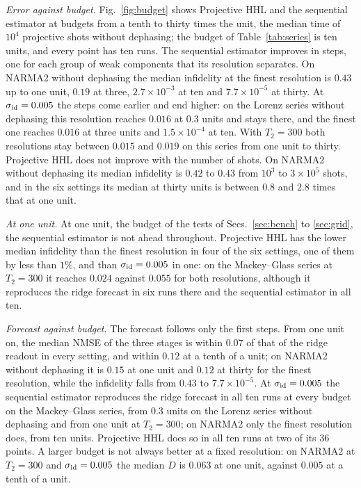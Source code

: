 \documentclass[journal]{IEEEtran}
\begin{document}
\emph{Error against budget.} Fig.~\ref{fig:budget} shows Projective HHL and the sequential estimator at budgets from a tenth to thirty times the unit, the median time of $10^4$ projective shots without dephasing; the budget of Table~\ref{tab:series} is ten units, and every point has ten runs. The sequential estimator improves in steps, one for each group of weak components that its resolution separates. On NARMA2 without dephasing the median infidelity at the finest resolution is $0.43$ up to one unit, $0.19$ at three, $2.7\times10^{-3}$ at ten and $7.7\times10^{-5}$ at thirty. At $\sigma_{\rm id}=0.005$ the steps come earlier and end higher: on the Lorenz series without dephasing this resolution reaches $0.016$ at $0.3$ units and stays there, and the finest one reaches $0.016$ at three units and $1.5\times10^{-4}$ at ten. With $T_2=300$ both resolutions stay between $0.015$ and $0.019$ on this series from one unit to thirty. Projective HHL does not improve with the number of shots. On NARMA2 without dephasing its median infidelity is $0.42$ to $0.43$ from $10^3$ to $3\times10^5$ shots, and in the six settings its median at thirty units is between $0.8$ and $2.8$ times that at one unit.

\emph{At one unit.} At one unit, the budget of the tests of Secs.~\ref{sec:bench} to \ref{sec:grid}, the sequential estimator is not ahead throughout. Projective HHL has the lower median infidelity than the finest resolution in four of the six settings, one of them by less than $1\%$, and than $\sigma_{\rm id}=0.005$ in one: on the Mackey--Glass series at $T_2=300$ it reaches $0.024$ against $0.055$ for both resolutions, although it reproduces the ridge forecast in six runs there and the sequential estimator in all ten.

\emph{Forecast against budget.} The forecast follows only the first steps. From one unit on, the median NMSE of the three stages is within $0.07$ of that of the ridge readout in every setting, and within $0.12$ at a tenth of a unit; on NARMA2 without dephasing it is $0.15$ at one unit and $0.12$ at thirty for the finest resolution, while the infidelity falls from $0.43$ to $7.7\times10^{-5}$. At $\sigma_{\rm id}=0.005$ the sequential estimator reproduces the ridge forecast in all ten runs at every budget on the Mackey--Glass series, from $0.3$ units on the Lorenz series without dephasing and from one unit at $T_2=300$; on NARMA2 only the finest resolution does, from ten units. Projective HHL does so in all ten runs at two of its $36$ points. A larger budget is not always better at a fixed resolution: on NARMA2 at $T_2=300$ and $\sigma_{\rm id}=0.005$ the median $D$ is $0.063$ at one unit, against $0.005$ at a tenth of a unit.
\end{document}
